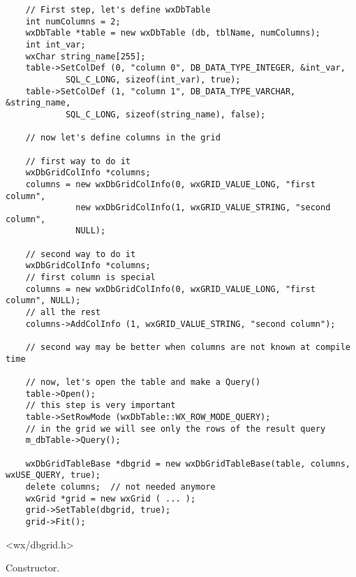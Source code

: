\begin{verbatim}
	// First step, let's define wxDbTable
	int numColumns = 2;
	wxDbTable *table = new wxDbTable (db, tblName, numColumns);
	int int_var;
	wxChar string_name[255];
	table->SetColDef (0, "column 0", DB_DATA_TYPE_INTEGER, &int_var,
			SQL_C_LONG, sizeof(int_var), true);
	table->SetColDef (1, "column 1", DB_DATA_TYPE_VARCHAR, &string_name,
			SQL_C_LONG, sizeof(string_name), false);

    // now let's define columns in the grid

    // first way to do it
    wxDbGridColInfo *columns;
    columns = new wxDbGridColInfo(0, wxGRID_VALUE_LONG, "first column",
              new wxDbGridColInfo(1, wxGRID_VALUE_STRING, "second column",
              NULL);

    // second way to do it
    wxDbGridColInfo *columns;
    // first column is special
    columns = new wxDbGridColInfo(0, wxGRID_VALUE_LONG, "first column", NULL);
    // all the rest
    columns->AddColInfo (1, wxGRID_VALUE_STRING, "second column");

    // second way may be better when columns are not known at compile time

    // now, let's open the table and make a Query()
    table->Open();
    // this step is very important
    table->SetRowMode (wxDbTable::WX_ROW_MODE_QUERY);
    // in the grid we will see only the rows of the result query
    m_dbTable->Query();

    wxDbGridTableBase *dbgrid = new wxDbGridTableBase(table, columns, wxUSE_QUERY, true);
    delete columns;  // not needed anymore
    wxGrid *grid = new wxGrid ( ... );
    grid->SetTable(dbgrid, true);
    grid->Fit();
\end{verbatim}



<wx/dbgrid.h>


\label{wxdbgridtablebaseconstr}


Constructor.



